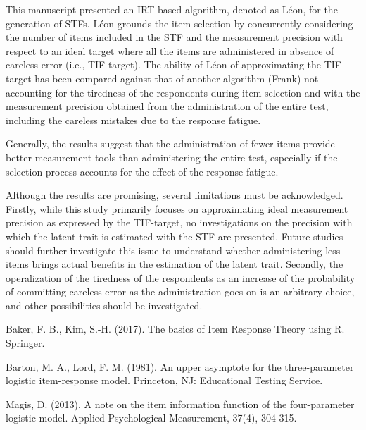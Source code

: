 \documentclass{svproc}
\begin{document}
This manuscript presented an IRT-based algorithm, denoted as Léon, for the generation of  STFs. 
Léon grounds the item selection by concurrently considering the number of items included in the STF and the measurement precision with respect to an ideal target where all the items are administered in absence of careless error (i.e., TIF-target). The ability of Léon of approximating the TIF-target has been compared against that of another algorithm (Frank) not accounting for the tiredness of the respondents during item selection and with the measurement precision obtained from the administration of the entire test, including the careless mistakes due to the response fatigue.
 

Generally, the results suggest that the administration of fewer items provide better measurement tools than administering the entire test, especially if the selection process accounts for the effect of the response fatigue.

Although the results are promising, several limitations must be acknowledged. Firstly, while this study primarily focuses on approximating ideal measurement precision as expressed by the TIF-target, no investigations on the precision with which the latent trait is estimated with the STF are presented. Future studies should further investigate this issue to understand whether administering less items brings actual benefits in the estimation of the latent trait.
Secondly, the operalization of the tiredness of the respondents as an increase of the probability of committing careless error as the administration goes on is an arbitrary choice, and other possibilities should be investigated.




%
\begin{thebibliography}{6}
%

 Baker, F. B., Kim, S.-H. (2017). The basics of Item Response Theory using R. Springer.

Barton, M. A., Lord, F. M. (1981). An upper asymptote for the three-parameter logistic item-response
model. Princeton, NJ: Educational Testing Service.



Magis, D. (2013). A note on the item information function of the four-parameter logistic model. Applied Psychological Measurement, 37(4), 304-315.






\end{thebibliography}
\end{document}
